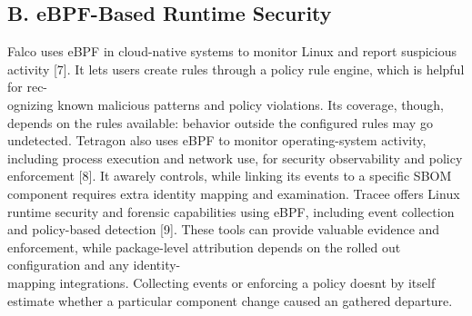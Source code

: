 \documentclass[conference]{IEEEtran}
\begin{document}
\subsection*{B. eBPF-Based Runtime Security}
Falco uses eBPF in cloud-native systems to monitor Linux and report suspicious activity {[}7{]}. It lets users create rules through a policy rule engine, which is helpful for rec-\\ognizing known malicious patterns and policy violations. Its coverage, though, depends on the rules available: behavior outside the configured rules may go undetected. Tetragon also uses eBPF to monitor operating-system activity, including process execution and network use, for security observability and policy enforcement {[}8{]}. It awarely controls, while linking its events to a specific SBOM component requires extra identity mapping and examination. Tracee offers Linux runtime security and forensic capabilities using eBPF, including event collection and policy-based detection {[}9{]}. These tools can provide valuable evidence and enforcement, while package-level attribution depends on the rolled out configuration and any identity-\\mapping integrations. Collecting events or enforcing a policy doesn\textquotesingle t by itself estimate whether a particular component change caused an gathered departure.
\end{document}
